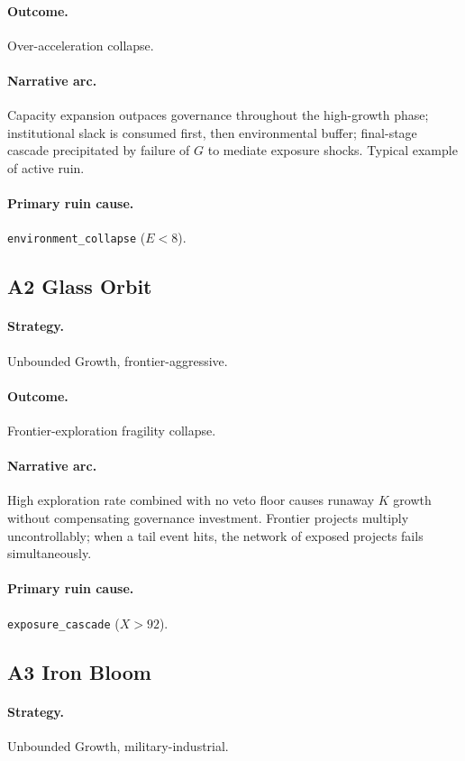 \paragraph{Outcome.} Over-acceleration collapse.
\paragraph{Narrative arc.}
Capacity expansion outpaces governance throughout the
high-growth phase; institutional slack is consumed first, then
environmental buffer; final-stage cascade precipitated by failure
of $G$ to mediate exposure shocks. Typical example of active ruin.
\paragraph{Primary ruin cause.} \texttt{environment\_collapse}
($E < 8$).

\subsection{A2 Glass Orbit}
\label{civ:a2}

\paragraph{Strategy.} Unbounded Growth, frontier-aggressive.
\paragraph{Outcome.} Frontier-exploration fragility collapse.
\paragraph{Narrative arc.}
High exploration rate combined with no veto floor causes
runaway $K$ growth without compensating governance investment.
Frontier projects multiply uncontrollably; when a tail event hits,
the network of exposed projects fails simultaneously.
\paragraph{Primary ruin cause.} \texttt{exposure\_cascade}
($X > 92$).

\subsection{A3 Iron Bloom}
\label{civ:a3}

\paragraph{Strategy.} Unbounded Growth, military-industrial.
